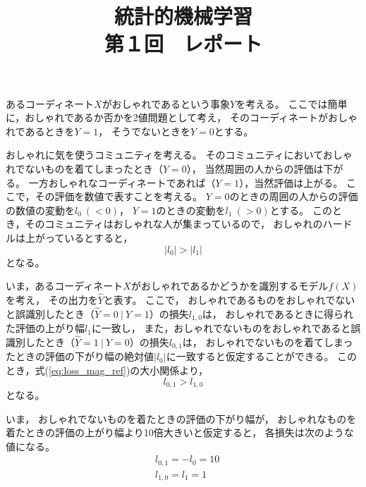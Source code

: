 \documentclass[dvipdfmx, fleqn]{jsarticle}
\title{
	統計的機械学習 \\
	第１回　レポート
	}
\begin{document}
\maketitle


あるコーディネート\(X\)がおしゃれであるという事象\(Y\)を考える。
ここでは簡単に，おしゃれであるか否かを2値問題として考え，
そのコーディネートがおしゃれであるときを\(Y = 1\)，
そうでないときを\(Y = 0\)とする。

おしゃれに気を使うコミュニティを考える。
そのコミュニティにおいておしゃれでないものを着てしまったとき（\(Y=0\)），
当然周囲の人からの評価は下がる。
一方おしゃれなコーディネートであれば（\(Y=1\)），当然評価は上がる。
ここで，その評価を数値で表すことを考える。
\(Y=0\)のときの周囲の人からの評価の数値の変動を\(l_0 \ (< 0)\)，
\(Y=1\)のときの変動を\(l_1 \ (> 0)\)とする。
このとき，そのコミュニティはおしゃれな人が集まっているので，
おしゃれのハードルは上がっているとすると，
\begin{equation}
	|l_0| > |l_1|	\label{eq:loss_mag_ref}
\end{equation}
となる。

いま，あるコーディネート\(X\)がおしゃれであるかどうかを識別するモデル\(f(X)\)を考え，
その出力を\(\hat{Y}\)と表す。
ここで，
おしゃれであるものをおしゃれでないと誤識別したとき（\(\hat{Y}=0\ |\ Y=1\)）の損失\(l_{1, 0}\)は，
おしゃれであるときに得られた評価の上がり幅\(l_1\)に一致し，
また，おしゃれでないものをおしゃれであると誤識別したとき（\(\hat{Y}=1\ |\ Y=0\)）の損失\(l_{0, 1}\)は，
おしゃれでないものを着てしまったときの評価の下がり幅の絶対値\(|l_0|\)に一致すると仮定することができる。
このとき，式(\ref{eq:loss_mag_ref})の大小関係より，
\begin{equation}
	l_{0, 1} > l_{1, 0}
\end{equation}
となる。

いま，
おしゃれでないものを着たときの評価の下がり幅が，
おしゃれなものを着たときの評価の上がり幅より10倍大きいと仮定すると，
各損失は次のような値になる。
\begin{align}
	& l_{0, 1} = -l_0 = 10 \\
	& l_{1, 0} = l_1 = 1
\end{align}
\end{document}
